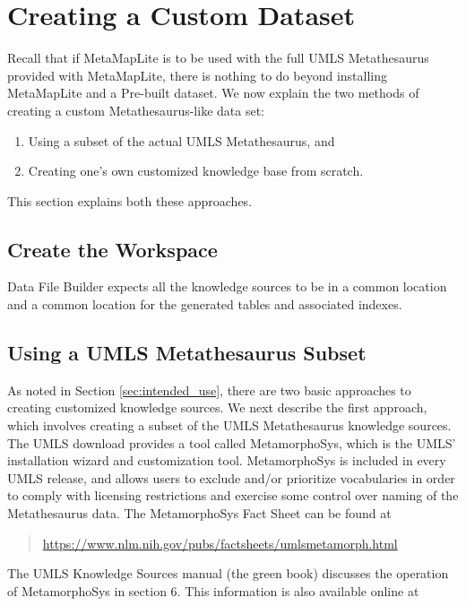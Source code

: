 \documentclass[letterpaper,article]{memoir}
\begin{document}
\chapter{Creating a Custom Dataset}\label{Creating}

Recall that if MetaMapLite is to be used with the full UMLS
Metathesaurus provided with MetaMapLite, there is nothing to do beyond
installing MetaMapLite and a Pre-built dataset.  We now explain the
two methods of creating a custom Metathesaurus-like data set:
\begin{enumerate}
    \item Using a subset of the actual UMLS Metathesaurus, and
    \item Creating one's own customized knowledge base from scratch.
\end{enumerate}
This section explains both these approaches.

\section{Create the Workspace}\label{Create the Workspace}

Data File Builder expects all the knowledge sources to be in a common
location and a common location for the generated tables and associated
indexes.

\section{Using a UMLS Metathesaurus Subset}\label{Using Subset}

As noted in Section \ref{sec:intended_use},
there are two basic approaches to creating
customized knowledge sources.
We next describe the first approach,
which involves creating a subset
of the UMLS Metathesaurus knowledge sources.
The UMLS download provides a tool called MetamorphoSys,
which is the UMLS' installation wizard and customization tool.
MetamorphoSys is included in every UMLS release,
and allows users to exclude and/or prioritize vocabularies
in order to comply with licensing restrictions
and exercise some control over naming of the Metathesaurus data.
The MetamorphoSys Fact Sheet can be found at

{\small
  \begin{quote}
    \url{https://www.nlm.nih.gov/pubs/factsheets/umlsmetamorph.html}
  \end{quote}
}

The UMLS Knowledge Sources manual (the green book)
discusses the operation of MetamorphoSys in section 6.
This information is also available online at
\end{document}
